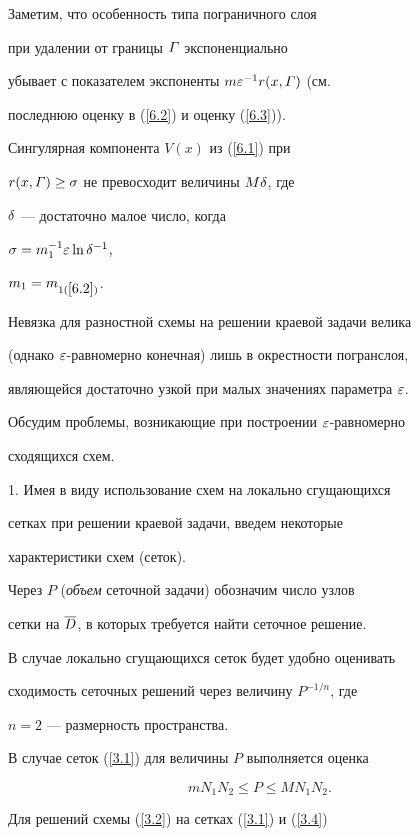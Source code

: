 Заметим, что особенность типа пограничного слоя


при удалении от границы $\varGamma$ экспоненциально


убывает с показателем экспоненты $m\varepsilon^{-1} r(x,\varGamma)$ (см.


последнюю оценку в (\ref{6.2}) и оценку (\ref{6.3})).


Сингулярная компонента $V(x)$ из (\ref{6.1}) при


$r(x,\varGamma)\ge \sigma$ не превосходит величины $M\delta$, где


$\delta$ --- достаточно малое число, когда


$\sigma=m_1^{-1}\varepsilon\ln \delta^{-1}$,


$m_1=m_{1(\ref{6.2})}$.


Невязка для разностной схемы на решении краевой задачи велика


(однако $\varepsilon$-равномерно конечная) лишь в окрестности погранслоя,


являющейся достаточно узкой при малых значениях параметра $\varepsilon$.





Обсудим проблемы, возникающие при построении $\varepsilon$-равномерно


сходящихся схем.





1. Имея в виду использование схем на локально сгущающихся


сетках при решении краевой задачи, введем некоторые


характеристики схем (сеток).


Через $P$ ({\it объем} сеточной задачи) обозначим число узлов


сетки на $\overline{D}$, в которых требуется найти сеточное решение.


В случае локально сгущающихся сеток будет удобно оценивать


сходимость сеточных решений через величину $P^{-1/n}$, где


$n=2$ --- размерность пространства.





В случае сеток (\ref{3.1}) для величины $P$ выполняется оценка


$$


m N_1N_2 \le P\le M N_1N_2.


$$


Для решений схемы (\ref{3.2}) на сетках (\ref{3.1}) и (\ref{3.4})



